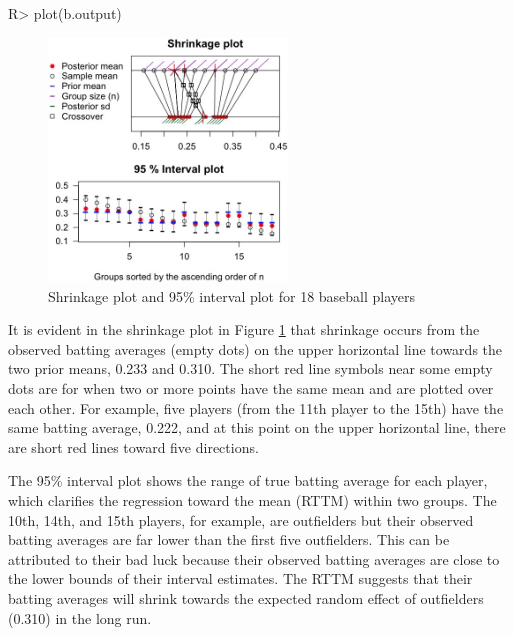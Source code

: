 \documentclass[article]{jss}
\begin{document}
\begin{CodeChunk}
\begin{CodeInput}
R> plot(b.output)
\end{CodeInput}
\end{CodeChunk}
\begin{figure}[h!]
\begin{center}
\includegraphics[width = 2.5in]{baseball1.png}
\caption{Shrinkage plot and 95\% interval plot for 18 baseball players}
\label{fig:baseball}
\end{center}
\end{figure}

It is evident in the shrinkage plot in Figure \ref{fig:baseball} that shrinkage occurs from the observed batting averages (empty dots) on the upper horizontal line towards the two prior means, 0.233 and 0.310. The short red line symbols near some empty dots are for when two or more points have the same mean and are plotted over each other. For example, five players (from the 11th player to the 15th) have the same batting average, 0.222, and at this point on the upper horizontal line, there are short red lines toward five directions.



The 95\% interval plot shows the range of true batting average for each player, which clarifies the regression toward the mean (RTTM) within two groups. The 10th, 14th, and 15th players, for example, are outfielders but their observed batting averages are far lower than the first five outfielders. This can  be attributed to their bad luck because their observed batting averages are close to the lower bounds of their interval estimates. The RTTM suggests that their batting averages will shrink towards the expected random effect of outfielders (0.310) in the long run.
\end{document}
